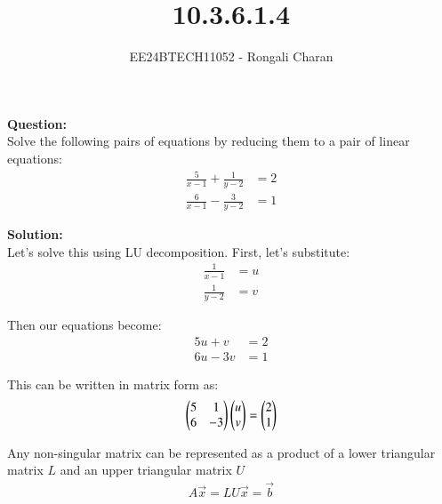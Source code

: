 \documentclass[journal]{IEEEtran}
\begin{document}

\vspace{3cm}

\title{10.3.6.1.4}
\author{EE24BTECH11052 - Rongali Charan}
 \maketitle
{\let\newpage\relax\maketitle}

\renewcommand{\thefigure}{\theenumi}
\renewcommand{\thetable}{\theenumi}
\setlength{\intextsep}{10pt} %


\renewcommand{\thetable}{\theenumi}


\textbf{Question:}\\
Solve the following pairs of equations by reducing them to a pair of linear equations:
\begin{align*}
    \frac{5}{x-1} + \frac{1}{y-2} &= 2\\
    \frac{6}{x-1} - \frac{3}{y-2} &= 1
\end{align*}

\textbf{Solution:}\\
Let's solve this using LU decomposition. First, let's substitute:
\begin{align}
    \frac{1}{x-1} &= u\\
    \frac{1}{y-2} &= v
\end{align}

Then our equations become:
\begin{align}
    5u + v &= 2 \label{eq1}\\
    6u - 3v &= 1 \label{eq2}
\end{align}

This can be written in matrix form as:
\begin{align}
    \begin{pmatrix}5 & 1\\6 & -3\end{pmatrix}\begin{pmatrix}u\\v\end{pmatrix} = \begin{pmatrix}2\\1\end{pmatrix}
\end{align}

Any non-singular matrix can be represented as a product of a lower triangular matrix $L$ and an upper triangular matrix $U$
\begin{align}
    A\vec{x} = LU\vec{x} = \vec{b}
\end{align}
\end{document}
